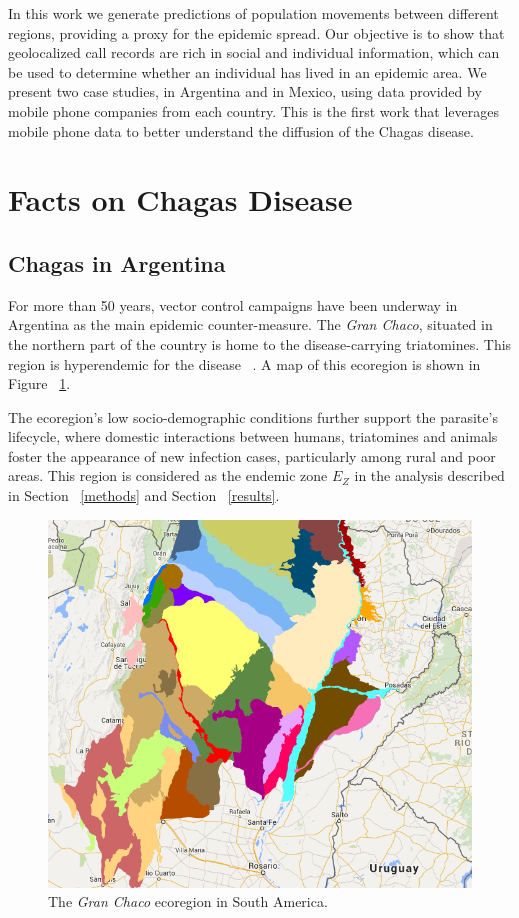  In this work we generate predictions of population movements between different regions, providing a proxy for the epidemic spread. Our objective is to show that geolocalized call records are rich in social and individual information, which can be used to determine whether an individual has lived in an epidemic area. We present two case studies, in Argentina and in Mexico, using data provided by mobile phone companies from each country. %
This is the first work that leverages mobile phone data to better understand the diffusion of the Chagas disease.




\section{Facts on Chagas Disease}

\subsection{Chagas in  Argentina}\label{endemic_zone_argentina}

For more than 50 years, vector control campaigns have been underway in Argentina as the main epidemic counter-measure. The \textit{Gran Chaco}, situated in the northern part of the country is home to the disease-carrying triatomines. This region is hyperendemic for the disease~ \textcite{OPS2014mapa}. A map of this ecoregion is shown in Figure~ \cref{fig:granchaco}.

The ecoregion's low socio-demographic conditions further support the parasite's lifecycle, where domestic interactions between humans, triatomines and animals foster the appearance of new infection cases, particularly among rural and poor areas.
This region is considered as the endemic zone $E_Z$ in the analysis described in Section~ \cref{methods} and Section~ \cref{results}.

\begin{figure}[h!]
\centering
\includegraphics[width=0.75\columnwidth]{figures/Ambientes_GranChaco_TNC-Argentina/Ambientes_GranChaco_TNC-Argentina.png}
\caption{The \textit{Gran Chaco} ecoregion in South America.%
}
\label{fig:granchaco}
\end{figure}


